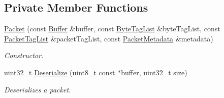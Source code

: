 \subsection*{Private Member Functions}
\begin{DoxyCompactItemize}
\item 
\hyperlink{classns3_1_1Packet_aac8558f4df4ea72feeaa7556a9cb1708}{Packet} (const \hyperlink{classns3_1_1Buffer}{Buffer} \&buffer, const \hyperlink{classns3_1_1ByteTagList}{Byte\+Tag\+List} \&byte\+Tag\+List, const \hyperlink{classns3_1_1PacketTagList}{Packet\+Tag\+List} \&packet\+Tag\+List, const \hyperlink{classns3_1_1PacketMetadata}{Packet\+Metadata} \&metadata)
\begin{DoxyCompactList}\small\item\em Constructor. \end{DoxyCompactList}\item 
uint32\+\_\+t \hyperlink{classns3_1_1Packet_a196f5609e8b04efef405cab130612151}{Deserialize} (uint8\+\_\+t const $\ast$buffer, uint32\+\_\+t size)
\begin{DoxyCompactList}\small\item\em Deserializes a packet. \end{DoxyCompactList}\end{DoxyCompactItemize}
